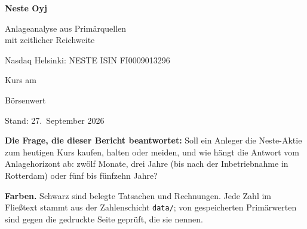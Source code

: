 \begin{titlepage}
\centering
\vspace*{3cm}
{\Huge\bfseries Neste Oyj\par}
\vspace{0.8cm}
{\Large Anlageanalyse aus Prim\"arquellen\\[0.2cm] mit zeitlicher Reichweite\par}
\vspace{0.4cm}
{\large Nasdaq Helsinki: NESTE \textbar{} ISIN FI0009013296\par}
\vspace{2.5cm}
{\large Kurs  am \KursDatum\par}
\vspace{0.3cm}
{\large B\"orsenwert \par}
\vspace{3cm}
{\large Stand: 27.~September 2026\par}
\vspace{1cm}
\begin{minipage}{0.86\linewidth}\small
\textbf{Die Frage, die dieser Bericht beantwortet:} Soll ein Anleger die Neste-Aktie zum
heutigen Kurs kaufen, halten oder meiden, und wie h\"angt die Antwort vom Anlagehorizont
ab: zw\"olf Monate, drei Jahre (bis nach der Inbetriebnahme in Rotterdam) oder f\"unf bis
f\"unfzehn Jahre?

\medskip
\textbf{Farben.} Schwarz sind belegte Tatsachen und Rechnungen.   Jede Zahl im Flie{\ss}text stammt
aus der Zahlenschicht \texttt{data/}; \GeprueftAnzahl{} von \GeprueftGesamt{} gespeicherten
Prim\"arwerten sind gegen die gedruckte Seite gepr\"uft, die sie nennen.
\end{minipage}
\end{titlepage}
